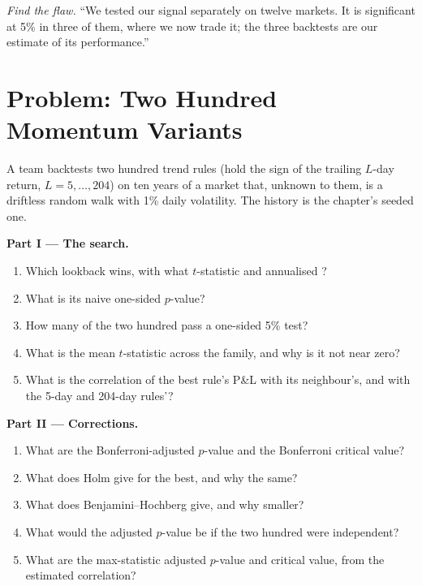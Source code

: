 \begin{exercise}[$\star\star\star$]\label{exo:qm:testing-and-multiple-testing:8}
\emph{Find the flaw.} ``We tested our signal separately on twelve markets. It is significant at 5\% in three of them, where we now
trade it; the three backtests are our estimate of its performance.''
\end{exercise}

\section{Problem: Two Hundred Momentum Variants}

\begin{problem}\label{pb:qm:testing-and-multiple-testing:1}
A team backtests two hundred trend rules (hold the sign of the trailing $L$-day return, $L = 5, \dots, 204$) on ten years of a
market that, unknown to them, is a driftless random walk with 1\% daily volatility. The history is the chapter's seeded one.

\medskip\noindent\textbf{Part I --- The search.}
\begin{enumerate}
\item Which lookback wins, with what $t$-statistic and annualised ?
\item What is its naive one-sided $p$-value?
\item How many of the two hundred pass a one-sided 5\% test?
\item What is the mean $t$-statistic across the family, and why is it not near zero?
\item What is the correlation of the best rule's P\&L with its neighbour's, and with the 5-day and 204-day rules'?
\end{enumerate}

\medskip\noindent\textbf{Part II --- Corrections.}
\begin{enumerate}[resume]
\item What are the Bonferroni-adjusted $p$-value and the Bonferroni critical value?
\item What does Holm give for the best, and why the same?
\item What does Benjamini--Hochberg give, and why smaller?
\item What would the adjusted $p$-value be if the two hundred were independent?
\item What are the max-statistic adjusted $p$-value and critical value, from the estimated correlation?
\end{enumerate}


\end{problem}
